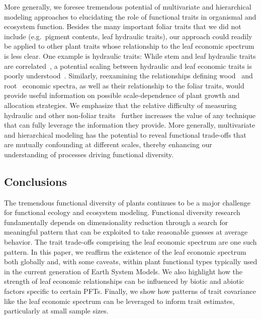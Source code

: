 More generally, we foresee tremendous potential of multivariate and hierarchical modeling approaches to elucidating the role of functional traits in organismal and ecosystem function. 
Besides the many important foliar traits that we did not include (e.g.\ pigment contents, leaf hydraulic traits), our approach could readily be applied to other plant traits whose relationship to the leaf economic spectrum is less clear. 
One example is hydraulic traits:
While stem and leaf hydraulic traits are correlated~\cite{bartlett_hydraulic}, a potential scaling between hydraulic and leaf economic traits is poorly understood~\cite{reich_world-wide_2014,li_leaf_2015}. 
Similarly, reexamining the relationships defining wood~\cite{chave_woodeconomics,baraloto_decoupled_2010,fortunel_leaf_2012} and root~\cite{kramer-walter_root_2016,valverde-barrantes_root_2016} economic spectra, as well as their relationship to the foliar traits, would provide useful information on possible scale-dependence of plant growth and allocation strategies.
We emphasize that the relative difficulty of measuring hydraulic and other non-foliar traits~\cite[e.g.\ ]{jansen_hydraulic_traits} further increases the value of any technique that can fully leverage the information they provide. 
More generally, multivariate and hierarchical modeling has the potential to reveal functional trade-offs that are mutually confounding at different scales, thereby enhancing our understanding of processes driving functional diversity.

\subsection{Conclusions}

The tremendous functional diversity of plants continues to be a major challenge for functional ecology and ecosystem modeling.
Functional diversity research fundamentally depends on dimensionality reduction through a search for meaningful pattern that can be exploited to take reasonable guesses at average behavior. 
The trait trade-offs comprising the leaf economic spectrum are one such pattern. 
In this paper, we reaffirm the existence of the leaf economic spectrum both globally and, with some caveats, within plant functional types typically used in the current generation of Earth System Models.
We also highlight how the strength of leaf economic relationships can be influenced by biotic and abiotic factors specific to certain PFTs.
Finally, we show how patterns of trait covariance like the leaf economic spectrum can be leveraged to inform trait estimates, particularly at small sample sizes.
